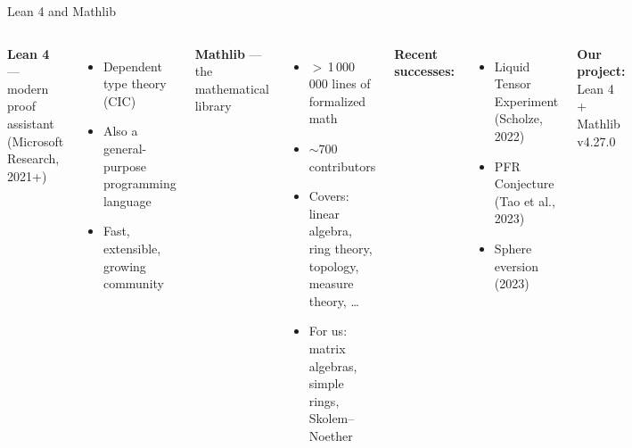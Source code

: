 \documentclass[aspectratio=169,10pt]{beamer}
\begin{document}
\begin{frame}{Lean 4 and Mathlib}
\vspace{-0.2em}
\begin{columns}[T]
{\small\textbf{Lean 4} --- modern proof assistant (Microsoft Research, 2021+)}
\begin{itemize}\itemsep0.1em
  \item {\small Dependent type theory (CIC)}
  \item {\small Also a general-purpose programming language}
  \item {\small Fast, extensible, growing community}
\end{itemize}

\vspace{0.3em}
{\small\textbf{Mathlib} --- the mathematical library}
\begin{itemize}\itemsep0.1em
  \item {\small $>$\,1\,000\,000 lines of formalized math}
  \item {\small $\sim$700 contributors}
  \item {\small Covers: linear algebra, ring theory, topology, measure theory, \dots}
  \item {\small For us: matrix algebras, simple rings, Skolem--Noether}
\end{itemize}

{\small\textbf{Recent successes:}}
\begin{itemize}\itemsep0.1em
  \item {\small Liquid Tensor Experiment (Scholze, 2022)}
  \item {\small PFR Conjecture (Tao et al., 2023)}
  \item {\small Sphere eversion (2023)}
\end{itemize}

\vspace{0.4em}
{\small\textbf{Our project:} Lean 4 + Mathlib v4.27.0}
\end{columns}
\end{frame}
\end{document}

